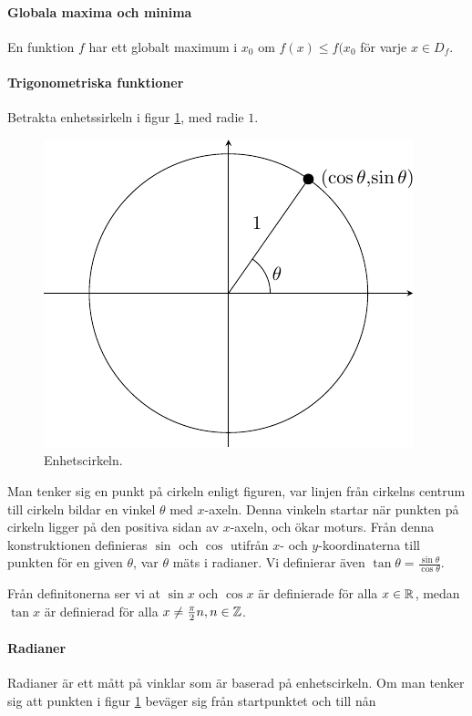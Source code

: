 \paragraph{Globala maxima och minima}
En funktion $f$ har ett globalt maximum i $x_0$ om $f(x)\leq f(x_0$ för varje $x\in D_f$.

\paragraph{Trigonometriska funktioner}

Betrakta enhetssirkeln i figur \ref{fig:unit_circle}, med radie $1$.

\begin{figure}[!ht]
	\centering
	\includegraphics[width=0.5\linewidth]{./Images/unit_circle/unit_circle.pdf}
	\caption{Enhetscirkeln.}
	\label{fig:unit_circle}
\end{figure}

Man tenker sig en punkt på cirkeln enligt figuren, var linjen från cirkelns centrum till cirkeln bildar en vinkel $\theta$ med $x$-axeln. Denna vinkeln startar när punkten på cirkeln ligger på den positiva sidan av $x$-axeln, och ökar moturs. Från denna konstruktionen definieras $\sin$ och $\cos$ utifrån $x$- och $y$-koordinaterna till punkten för en given $\theta$, var $\theta$ mäts i radianer. Vi definierar även $\tan\theta=\frac{\sin\theta}{\cos\theta}$.

Från definitonerna ser vi at $\sin x$ och $\cos x$ är definierade för alla $x\in\mathbb{R}$, medan $\tan x$ är definierad för alla $x\neq \frac{\pi}{2}n, n\in\mathbb{Z}$.

\paragraph{Radianer}

Radianer är ett mått på vinklar som är baserad på enhetscirkeln. Om man tenker sig att punkten i figur \ref{fig:unit_circle} beväger sig från startpunktet och till nån 

